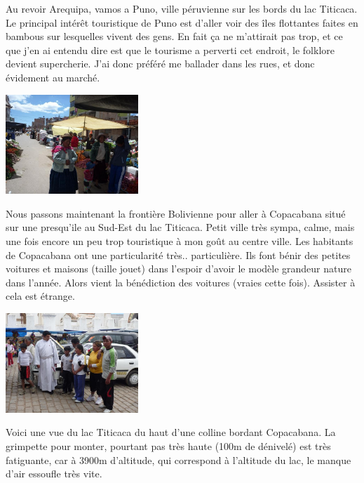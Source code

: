 \begin{multicols}{2}
Au revoir Arequipa, vamos a Puno, ville péruvienne sur les bords du lac Titicaca. Le principal intérêt touristique de Puno est d'aller voir des îles flottantes faites en bambous sur lesquelles vivent des gens. En fait ça ne m'attirait pas trop, et ce que j'en ai entendu dire est que le tourisme a perverti cet endroit, le folklore devient supercherie. J'ai donc préféré me ballader dans les rues, et donc évidement au marché.

\smallbreak
\hspace*{-0.65cm}
\includegraphics[width=5cm]{articles/Arequipa-colca-titicaca/12566069210hdx.jpg}
\smallbreak

Nous passons maintenant la frontière Bolivienne pour aller à Copacabana situé sur une presqu'ile au Sud-Est du lac Titicaca. Petit ville très sympa, calme, mais une fois encore un peu trop touristique à mon goût au centre ville. Les habitants de Copacabana ont une particularité très.. particulière. Ils font bénir des petites voitures et maisons (taille jouet) dans l'espoir d'avoir le modèle grandeur nature dans l'année. Alors vient la bénédiction des voitures (vraies cette fois). Assister à cela est étrange.

\smallbreak
\hspace*{-0.65cm}
\includegraphics[width=5cm]{articles/Arequipa-colca-titicaca/1256606967Syll.jpg}
\smallbreak

Voici une vue du lac Titicaca du haut d'une colline bordant Copacabana. La grimpette pour monter, pourtant pas très haute (100m de dénivelé) est très fatiguante, car à 3900m d'altitude, qui correspond à l'altitude du lac, le manque d'air essoufle très vite.


\end{multicols}
